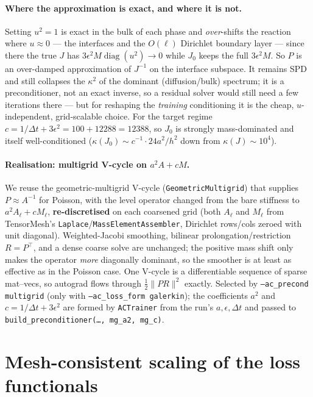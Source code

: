 \documentclass[11pt]{article}
\newcommand{\dt}{\Delta t}
\DeclareMathOperator{\diag}{diag}
\begin{document}
\paragraph{Where the approximation is exact, and where it is not.} Setting $u^2=1$ is exact in the
bulk of each phase and \emph{over}-shifts the reaction where $u\approx0$ --- the interfaces and the
$O(\ell)$ Dirichlet boundary layer --- since there the true $J$ has $3\epsilon^2M\diag(u^2)\to0$
while $J_0$ keeps the full $3\epsilon^2M$. So $P$ is an over-damped approximation of $J^{-1}$ on the
interface subspace. It remains SPD and still collapses the $\kappa^2$ of the dominant
(diffusion/bulk) spectrum; it is a preconditioner, not an exact inverse, so a residual solver would
still need a few iterations there --- but for reshaping the \emph{training} conditioning it is the
cheap, $u$-independent, grid-scalable choice. For the target regime $c=1/\dt+3\epsilon^2=100+12288
=12388$, so $J_0$ is strongly mass-dominated and itself well-conditioned
($\kappa(J_0)\sim c^{-1}\!\cdot\!24a^2/h^2$ down from $\kappa(J)\sim10^4$).

\paragraph{Realisation: multigrid V-cycle on $a^2A+cM$.} We reuse the geometric-multigrid V-cycle
(\texttt{GeometricMultigrid}) that supplies $P\approx A^{-1}$ for Poisson, with the level operator
changed from the bare stiffness to $a^2A_\ell + cM_\ell$, \textbf{re-discretised} on each coarsened
grid (both $A_\ell$ and $M_\ell$ from TensorMesh's \texttt{Laplace}/\texttt{MassElementAssembler},
Dirichlet rows/cols zeroed with unit diagonal). Weighted-Jacobi smoothing, bilinear
prolongation/restriction $R=P^\top$, and a dense coarse solve are unchanged; the positive mass
shift only makes the operator \emph{more} diagonally dominant, so the smoother is at least as
effective as in the Poisson case. One V-cycle is a differentiable sequence of sparse mat--vecs, so
autograd flows through $\tfrac12\|P R\|^2$ exactly. Selected by \texttt{--ac\_precond multigrid}
(only with \texttt{--ac\_loss\_form galerkin}); the coefficients $a^2$ and $c=1/\dt+3\epsilon^2$ are
formed by \texttt{ACTrainer} from the run's $a,\epsilon,\dt$ and passed to
\texttt{build\_preconditioner(\dots, mg\_a2, mg\_c)}.

\section{Mesh-consistent scaling of the loss functionals}
\label{sec:scaling}
\end{document}
